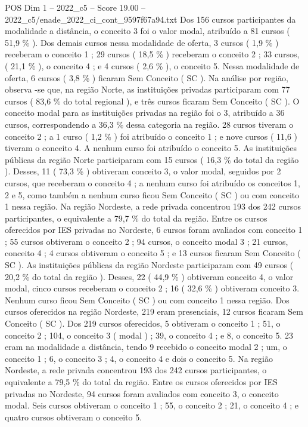\begin{textsample}{POS Dim 1 – 2022\_c5 – Score 19.00 – 2022\_c5/enade\_2022\_ci\_cont\_9597f67a94.txt}
Dos 156 cursos participantes da modalidade a distância, o conceito 3 foi o valor modal, atribuído a 81 cursos ( 51,9 \% ).
Dos demais cursos nessa modalidade de oferta, 3 cursos ( 1,9 \% ) receberam o conceito 1 ; 29 cursos ( 18,5 \% ) receberam o conceito 2 ; 33 cursos, ( 21,1 \% ), o conceito 4 ; e 4 cursos ( 2,6 \% ), o conceito 5.
Nessa modalidade de oferta, 6 cursos ( 3,8 \% ) ficaram Sem Conceito ( SC ).
Na análise por região, observa -se que, na região Norte, as instituições privadas participaram com 77 cursos ( 83,6 \% do total regional ), e três cursos ficaram Sem Conceito ( SC ).
O conceito modal para as instituições privadas na região foi o 3, atribuído a 36 cursos, correspondendo a 36,3 \% dessa categoria na região. 28 cursos tiveram o conceito 2 ; a 1 curso ( 1,2 \% ) foi atribuído o conceito 1 ; e nove cursos ( 11,6 ) tiveram o conceito 4.
A nenhum curso foi atribuído o conceito 5.
As instituições públicas da região Norte participaram com 15 cursos ( 16,3 \% do total da região ).
Desses, 11 ( 73,3 \% ) obtiveram conceito 3, o valor modal, seguidos por 2 cursos, que receberam o conceito 4 ; a nenhum curso foi atribuído os conceitos 1, 2 e 5, como também a nenhum curso ficou Sem Conceito ( SC ) ou com conceito 1 nessa região.
Na região Nordeste, a rede privada concentrou 193 dos 242 cursos participantes, o equivalente a 79,7 \% do total da região.
Entre os cursos oferecidos por IES privadas no Nordeste, 6 cursos foram avaliados com conceito 1 ; 55 cursos obtiveram o conceito 2 ; 94 cursos, o conceito modal 3 ; 21 cursos, conceito 4 ; 4 cursos obtiveram o conceito 5 ; e 13 cursos ficaram Sem Conceito ( SC ).
As instituições públicas da região Nordeste participaram com 49 cursos ( 20,2 \% do total da região ).
Desses, 22 ( 44,9 \% ) obtiveram conceito 4, o valor modal, cinco cursos receberam o conceito 2 ; 16 ( 32,6 \% ) obtiveram conceito 3.
Nenhum curso ficou Sem Conceito ( SC ) ou com conceito 1 nessa região.
Dos cursos oferecidos na região Nordeste, 219 eram presenciais, 12 cursos ficaram Sem Conceito ( SC ).
Dos 219 cursos oferecidos, 5 obtiveram o conceito 1 ; 51, o conceito 2 ; 104, o conceito 3 ( modal ) ; 39, o conceito 4 ; e 8, o conceito 5. 23 eram na modalidade a distância, tendo 9 recebido o conceito modal 2 ; um, o conceito 1 ; 6, o conceito 3 ; 4, o conceito 4 e dois o conceito 5.
Na região Nordeste, a rede privada concentrou 193 dos 242 cursos participantes, o equivalente a 79,5 \% do total da região.
Entre os cursos oferecidos por IES privadas no Nordeste, 94 cursos foram avaliados com conceito 3, o conceito modal.
Seis cursos obtiveram o conceito 1 ; 55, o conceito 2 ; 21, o conceito 4 ; e quatro cursos obtiveram o conceito 5.

\end{textsample}
